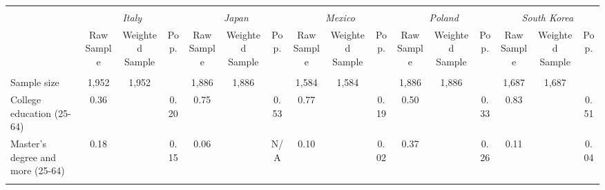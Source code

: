 \begin{tabular}{l*{15}{c}}
\toprule
\hline \\[-1.8ex]
\multicolumn{1}{c}{\em{ }} & \multicolumn{3}{c}{\em{Italy}} & \multicolumn{3}{c}{\em{Japan}} & \multicolumn{3}{c}{\em{Mexico}} & \multicolumn{3}{c}{\em{Poland}} & \multicolumn{3}{c}{\em{South Korea}} \\
\cmidrule(l{3pt}r{3pt}){2-4} \cmidrule(l{3pt}r{3pt}){5-7} \cmidrule(l{3pt}r{3pt}){8-10} \cmidrule(l{3pt}r{3pt}){11-13} \cmidrule(l{3pt}r{3pt}){14-16}
\noalign{\smallskip}  & Raw Sample & Weighted Sample & Pop. & Raw Sample & Weighted Sample & Pop. & Raw Sample & Weighted Sample & Pop. & Raw Sample & Weighted Sample & Pop. & Raw Sample & Weighted Sample & Pop. \\
\hline \\[-1.8ex] 
Sample size & 1,952 & 1,952 & & 1,886 & 1,886 & & 1,584 & 1,584 & & 1,886 & 1,886 & & 1,687 & 1,687 & \\
\noalign{\smallskip}\hline \noalign{\smallskip}
College education (25-64) & 0.36 & & 0.20 & 0.75 & & 0.53 & 0.77 & & 0.19 & 0.50 & & 0.33 & 0.83 & & 0.51 \\
Master's degree and more (25-64) & 0.18 & & 0.15 & 0.06 & & N/A & 0.10 & & 0.02 & 0.37 & & 0.26 & 0.11 & & 0.04 \\
\\
\bottomrule
\end{tabular}